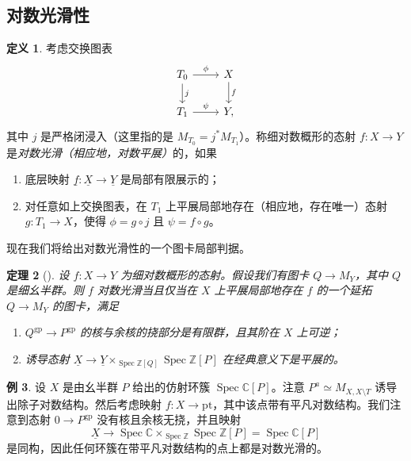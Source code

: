 \documentclass{amsart}
\newtheorem{thm}{定理}[section]
\theoremstyle{definition}
\newtheorem{defn}[thm]{定义}
\newtheorem{exm}[thm]{例}
\theoremstyle{remark}
\theoremstyle{plain}
\theoremstyle{definition}
\theoremstyle{remark}
\newcommand{\C}{\mathbb{C}}
\newcommand{\Z}{\mathbb{Z}}
\newcommand{\mr}[1]{\mathrm{#1}}
\newcommand{\ul}[1]{\underline{#1}}
\newcommand{\1}{\mathbf{1}}
\newcommand{\2}{\mathbf{2}}
\newcommand{\3}{\mathbf{3}}
\DeclareMathOperator{\Spec}{Spec}
\begin{document}
\subsection{对数光滑性}%
\label{sub:Log smoothness}

\begin{defn}
    考虑交换图表
    \begin{equation*}
    \begin{tikzcd}
        T_0 \ar{r}{\phi} \ar{d}{j} & X \ar{d}{f} \\
        T_1 \ar{r}{\psi} & Y,
    \end{tikzcd}
    \end{equation*}
    其中 \(j\) 是严格闭浸入（这里指的是 \(M_{T_0} = j^* M_{T_1}\)）。称细对数概形的态射 \(f \colon X \to Y\) 是\textit{对数光滑（相应地，对数平展）}的，如果
    \begin{enumerate}
        \item 底层映射 \(\ul{f} \colon \ul{X} \to \ul{Y}\) 是局部有限展示的；
        \item 对任意如上交换图表，在 \(T_1\) 上平展局部地存在（相应地，存在唯一）态射 \(g \colon T_1 \to X\)，使得 \(\phi = g \circ j\) 且 \(\psi = f \circ g\)。
    \end{enumerate}
\end{defn}

现在我们将给出对数光滑性的一个图卡局部判据。

\begin{thm}[{\cite[定理~3.5]{Kato1989}}]
    设 \(f \colon X \to Y\) 为细对数概形的态射。假设我们有图卡 \(Q \to M_Y\)，其中 \(Q\) 是细幺半群。则 \(f\) 对数光滑当且仅当在 \(X\) 上平展局部地存在 \(f\) 的一个延拓 \(Q \to M_Y\) 的图卡，满足
    \begin{enumerate}
        \item \(Q^{\mr{gp}} \to P^{\mr{gp}}\) 的核与余核的挠部分是有限群，且其阶在 \(X\) 上可逆；
        \item 诱导态射 \(\ul{X} \to \ul{Y} \times_{\Spec \Z[Q]} \Spec \Z[P]\) 在经典意义下是平展的。
    \end{enumerate}
\end{thm}

\begin{exm}
    设 \(X\) 是由幺半群 \(P\) 给出的仿射环簇 \(\Spec \C[P]\)。注意 \(P^a \simeq M_{X, X \setminus T}\) 诱导出除子对数结构。然后考虑映射 \(f \colon X \to \mr{pt}\)，其中该点带有平凡对数结构。我们注意到态射 \(0 \to P^{\mr{gp}}\) 没有核且余核无挠，并且映射
    \[ \ul{X} \to \Spec \C \times_{\Spec \Z} \Spec \Z[P] = \Spec \C[P] \]
    是同构，因此任何环簇在带平凡对数结构的点上都是对数光滑的。
\end{exm}
\end{document}
